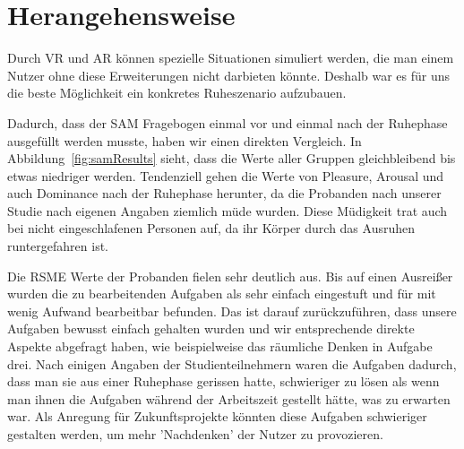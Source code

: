 \section{Herangehensweise}

Durch VR und AR können spezielle Situationen simuliert werden, die man einem Nutzer ohne diese Erweiterungen nicht darbieten könnte. Deshalb war es für uns die beste Möglichkeit ein konkretes Ruheszenario aufzubauen.

Dadurch, dass der SAM Fragebogen einmal vor und einmal nach der Ruhephase ausgefüllt werden musste, haben wir einen direkten Vergleich. In Abbildung~\ref{fig:samResults} sieht, dass die Werte aller Gruppen gleichbleibend bis etwas niedriger werden. Tendenziell gehen die Werte von Pleasure, Arousal und auch Dominance nach der Ruhephase herunter, da die Probanden nach unserer Studie nach eigenen Angaben ziemlich müde wurden. Diese Müdigkeit trat auch bei nicht eingeschlafenen Personen auf, da ihr Körper durch das Ausruhen runtergefahren ist. 

Die RSME Werte der Probanden fielen sehr deutlich aus. Bis auf einen Ausreißer wurden die zu bearbeitenden Aufgaben als sehr einfach eingestuft und für mit wenig Aufwand bearbeitbar befunden. Das ist darauf zurückzuführen, dass unsere Aufgaben bewusst einfach gehalten wurden und wir entsprechende direkte Aspekte abgefragt haben, wie beispielweise das räumliche Denken in Aufgabe drei. Nach einigen Angaben der Studienteilnehmern waren die Aufgaben dadurch, dass man sie aus einer Ruhephase gerissen hatte, schwieriger zu lösen als wenn man ihnen die Aufgaben während der Arbeitszeit gestellt hätte, was zu erwarten war. Als Anregung für Zukunftsprojekte könnten diese Aufgaben schwieriger gestalten werden, um mehr 'Nachdenken' der Nutzer zu provozieren.
